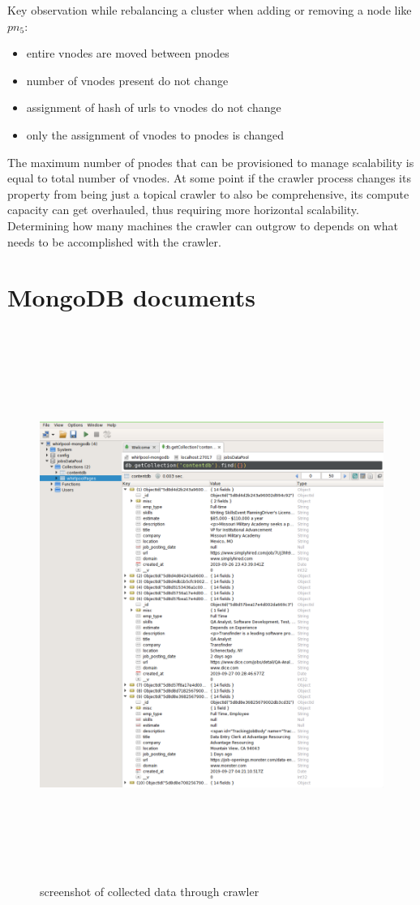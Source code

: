 \noindent
Key observation while rebalancing a cluster when adding or removing a node like $pn_5$:
\begin{itemize}
  \item entire vnodes are moved between pnodes
  \item number of vnodes present do not change 
  \item assignment of hash of urls to vnodes do not change
  \item only the assignment of vnodes to pnodes is changed
\end{itemize}

\noindent
The maximum number of pnodes that can be provisioned to manage scalability is equal to total number of
vnodes. At some point if the crawler process changes its property from being just a topical crawler to
also be comprehensive, its compute capacity can get overhauled, thus requiring more horizontal scalability.
Determining how many machines the crawler can outgrow to depends on what needs to be accomplished with the crawler.

\pagebreak

\section{MongoDB documents}
\begin{figure}[h!]
  \centering
  \includegraphics[width=12cm,height=18cm,keepaspectratio]{../media/crawler/collecteddata.png}
  \caption{screenshot of collected data through crawler}
  \label{fig:mongo_data}
\end{figure}
\pagebreak

